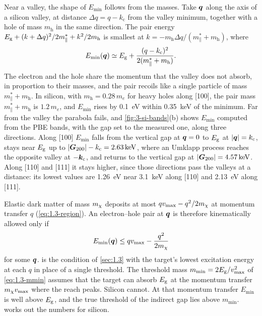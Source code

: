 Near a valley, the shape of $E_{\mathrm{min}}$ follows from the masses. Take $\bm{q}$ along the axis of a silicon valley, at distance $\Delta q = q - k_{\mathrm{c}}$ from the valley minimum, together with a hole of mass $m_{\mathrm{h}}$ in the same direction. The pair energy $E_{\mathrm{g}} + (k + \Delta q)^2/2m^*_\parallel + k^2/2m_{\mathrm{h}}$ is smallest at $k = -m_{\mathrm{h}}\Delta q/(m^*_\parallel + m_{\mathrm{h}})$, where
\begin{equation}
  E_{\mathrm{min}}(\bm{q}) \simeq E_{\mathrm{g}} + \frac{(q - k_{\mathrm{c}})^2}{2(m^*_\parallel + m_{\mathrm{h}})} .
  \label{eq:3.3-Eminpar}
\end{equation}
The electron and the hole share the momentum that the valley does not absorb, in proportion to their masses, and the pair recoils like a single particle of mass $m^*_\parallel + m_{\mathrm{h}}$. In silicon, with $m_{\mathrm{h}} = 0.28\,m_e$ for heavy holes along [100], the pair mass $m^*_\parallel + m_{\mathrm{h}}$ is $1.2\,m_e$, and $E_{\mathrm{min}}$ rises by \SI{0.1}{eV} within \SI{0.35}{keV} of the minimum. Far from the valley the parabola fails, and \cref{fig:3-si-bands}(b) shows $E_{\mathrm{min}}$ computed from the PBE bands, with the gap set to the measured one, along three directions. Along [100] $E_{\mathrm{min}}$ falls from the vertical gap at $\bm{q} = 0$ to $E_{\mathrm{g}}$ at $|\bm{q}| = k_{\mathrm{c}}$, stays near $E_{\mathrm{g}}$ up to $|\bm{G}_{200}| - k_{\mathrm{c}} = \SI{2.63}{keV}$, where an Umklapp process reaches the opposite valley at $-\bm{k}_{\mathrm{c}}$, and returns to the vertical gap at $|\bm{G}_{200}| = \SI{4.57}{keV}$. Along [110] and [111] it stays higher, since those directions pass the valleys at a distance: its lowest values are \SI{1.26}{eV} near \SI{3.1}{keV} along [110] and \SI{2.13}{eV} along [111].

Elastic dark matter of mass $m_{\chi}$ deposits at most $qv_{\mathrm{max}} - q^2/2m_{\chi}$ at momentum transfer $q$ (\cref{eq:1.3-region}). An electron--hole pair at $\bm{q}$ is therefore kinematically allowed only if
\begin{equation}
  E_{\mathrm{min}}(\bm{q}) \le qv_{\mathrm{max}} - \frac{q^2}{2m_{\chi}}
  \label{eq:3.3-allowed}
\end{equation}
for some $\bm{q}$.  is the condition of \cref{sec:1.3} with the target's lowest excitation energy at each $q$ in place of a single threshold. The threshold mass $m_{\mathrm{min}} = 2E_{\mathrm{g}}/v_{\mathrm{max}}^2$ of \cref{eq:1.3-mmin} assumes that the target can absorb $E_{\mathrm{g}}$ at the momentum transfer $m_{\chi} v_{\mathrm{max}}$ where the reach peaks. Silicon cannot. At that momentum transfer $E_{\mathrm{min}}$ is well above $E_{\mathrm{g}}$, and the true threshold of the indirect gap lies above $m_{\mathrm{min}}$.  works out the numbers for silicon.

